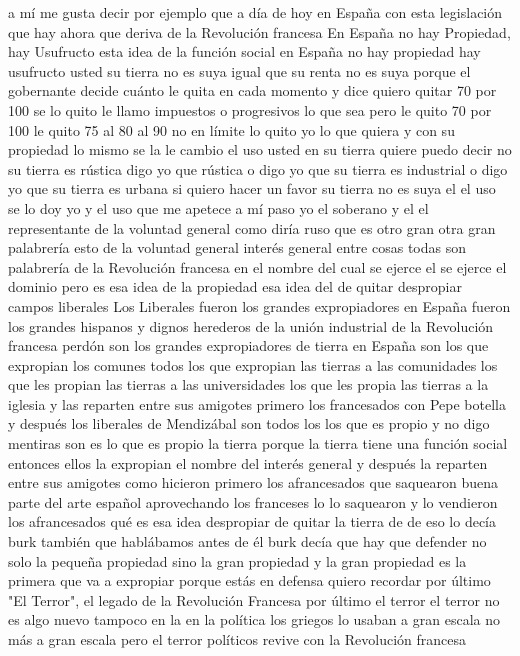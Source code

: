 a mí me gusta decir por ejemplo que a día de hoy en España con esta legislación que hay ahora que deriva de la Revolución francesa
En España no hay Propiedad, hay Usufructo
esta idea de la función social en España no hay propiedad hay usufructo usted su tierra no es suya
igual que su renta no es suya porque el gobernante decide cuánto le quita en cada momento y dice quiero quitar 70 por 100
se lo quito le llamo impuestos o progresivos lo que sea pero le quito 70 por 100 le quito 75 al 80 al 90 no en límite lo quito yo lo que quiera
y con su propiedad lo mismo se la le cambio el uso usted en su tierra quiere puedo decir no
su tierra es rústica digo yo que rústica o digo yo que su tierra es industrial o digo yo que su tierra es urbana
si quiero hacer un favor su tierra no es suya el el uso se lo doy yo y el uso que me apetece a mí paso yo el soberano y el
el representante de la voluntad general como diría ruso que es otro gran otra gran palabrería esto de la voluntad general
interés general entre cosas todas son palabrería de la Revolución francesa en el nombre del cual se ejerce el
se ejerce el dominio pero es esa idea de la propiedad esa idea del de quitar despropiar campos liberales
Los Liberales fueron los grandes expropiadores en España
fueron los grandes hispanos y dignos herederos de la unión industrial de la Revolución francesa perdón son los grandes expropiadores de tierra
en España son los que expropian los comunes todos los que expropian las tierras a las comunidades los que les propian las tierras a las universidades
los que les propia las tierras a la iglesia y las reparten entre sus amigotes primero los francesados
con Pepe botella y después los liberales de Mendizábal son todos los los que es propio y no digo mentiras
son es lo que es propio la tierra porque la tierra tiene una función social entonces ellos la expropian el nombre del interés general
y después la reparten entre sus amigotes como hicieron primero los afrancesados que saquearon buena parte del arte español
aprovechando los franceses lo lo saquearon y lo vendieron los afrancesados
qué es esa idea despropiar de quitar la tierra de de eso lo decía burk
también que hablábamos antes de él burk decía que hay que defender no solo la pequeña propiedad sino la gran propiedad
y la gran propiedad es la primera que va a expropiar porque estás en defensa quiero recordar por último
"El Terror", el legado de la Revolución Francesa
por último el terror
el terror no es algo nuevo tampoco en la en la política los griegos lo usaban a gran escala
no más a gran escala pero el terror políticos revive con la Revolución francesa

